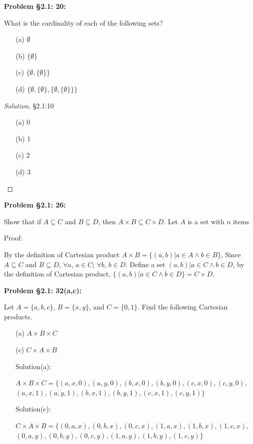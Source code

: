 \documentclass{article}
\newenvironment{solution}{\begin{proof}[Solution]}{\end{proof}}
\newenvironment{problem}[1]
{\begin{mdframed}[default]
\textbf{Problem #1:}
}
{\end{mdframed}
}
\begin{document}
\begin{problem}{\S 2.1: 20}
What is the cardinality of each of the following sets?
\begin{enumerate}
\item[(a)] $\emptyset$ 
\item[(b)] $\{ \emptyset \}$ 
\item[(c)] $\{ \emptyset, \{ \emptyset \} \}$ 
\item[(d)] $\{ \emptyset, \{ \emptyset \}, \{ \emptyset, \{ \emptyset \} \} \}$ 
\end{enumerate}
\begin{solution}{\S2.1:10}
    \begin{enumerate}
\item[(a)]0
\item[(b)]1
\item[(c)]2
\item[(d)]3
    \end{enumerate}
\end{solution}
\end{problem}
\newpage
\begin{problem}{\S 2.1: 26}
Show that if $A \subseteq C$ and $B \subseteq D$, then $A \times B \subseteq C \times D.$\newline
Let $A$ is a set with $n$ items

Proof:

By the definition of Cartesian product $A \times B = \{(a,b)|a \in A \land b \in B\}$,
Since $A \subseteq C$ and $B \subseteq D$, $\forall a$, $a \in C$; $\forall b$, $b \in D$.
Define a set ${(a,b)|a\in C \land b \in D}$, by the definition of Cartesian product,
$\{(a,b)|a\in C \land b \in D\}=C \times D$.

\end{problem}
\begin{problem}{\S 2.1: 32(a,c)}
Let $A = \{ a, b, c \}$, $B = \{ x, y \}$, and $C = \{ 0, 1 \}$. Find the following
Cartesian products.
\begin{enumerate}
\item[(a)] $A \times B \times C$ 

\item[(c)] $C \times A \times B$\newline

Solution(a):

$A \times B \times C=\{(a,x,0),(a,y,0),(b,x,0),(b,y,0),(c,x,0),(c,y,0),$\newline
$(a,x,1),(a,y,1),(b,x,1),(b,y,1),(c,x,1),(c,y,1)\}$


Solution(c):

$C \times A \times B=\{(0,a,x),(0,b,x),(0,c,x),(1,a,x),(1,b,x),(1,c,x),$\newline 
$(0,a,y),(0,b,y),(0,c,y),(1,a,y),(1,b,y),(1,c,y)\}$


\end{enumerate}
\end{problem}
\end{document}
